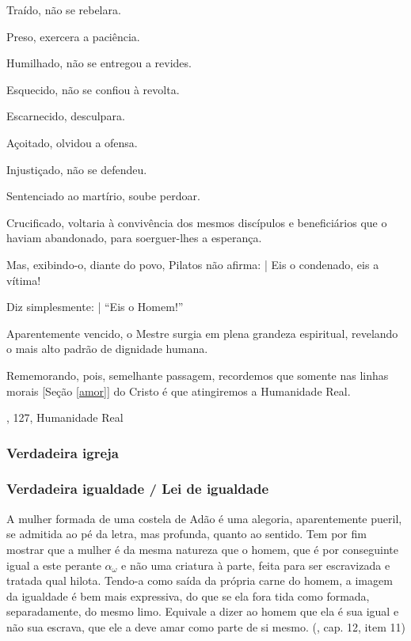 \documentclass[12pt,a4paper]{article}
\begin{document}
				Tra\'ido, n\~ao se rebelara.

				Preso, exercera a paci\^encia.

				Humilhado, n\~ao se entregou a revides.

				Esquecido, n\~ao se confiou \`a revolta.

				Escarnecido, desculpara.

				A\c{c}oitado, olvidou a ofensa.

				Injusti\c{c}ado, n\~ao se defendeu.

				Sentenciado ao mart\'irio, soube perdoar.

				Crucificado, voltaria \`a conviv\^encia dos mesmos disc\'ipulos e benefici\'arios que o haviam abandonado, para soerguer-lhes a esperan\c{c}a.

				Mas, exibindo-o, diante do povo, Pilatos n\~ao afirma: | Eis o condenado, eis a v\'itima!

				Diz simplesmente: | \textquotedblleft Eis o Homem!\textquotedblright

				Aparentemente vencido, o Mestre surgia em plena grandeza espiritual, revelando o mais alto padr\~ao de dignidade humana.

				Rememorando, pois, semelhante passagem, recordemos que somente nas linhas morais [Se\c{c}\~ao \ref{amor}] do Cristo \'e que atingiremos a Humanidade Real.

				\cite{fonteViva}, 127, Humanidade Real

			\subsubsection{Verdadeira igreja}
			\begin{flushright}
			\end{flushright}

                        \cite{igreja}

			\subsubsection{Verdadeira igualdade / Lei de igualdade}\label{leiIgualdade}
			\begin{flushright}
			\end{flushright}

				A mulher formada de uma costela de Ad\~ao \'e uma alegoria, aparentemente pueril, se admitida ao p\'e da letra, mas profunda, quanto ao sentido. Tem por fim mostrar que a mulher \'e da mesma natureza que o homem, que \'e por conseguinte igual a este perante $ \alpha_\omega $ e n\~ao uma criatura \cite{criatura} \`a parte, feita para ser escravizada e tratada qual hilota. Tendo-a como sa\'ida da pr\'opria carne do homem, a imagem da igualdade \'e bem mais expressiva, do que se ela fora tida como formada, separadamente, do mesmo limo. Equivale a dizer ao homem que ela \'e sua igual e n\~ao sua escrava, que ele a deve amar como parte de si mesmo. (\cite{genese}, cap. 12, item 11)
\end{document}
